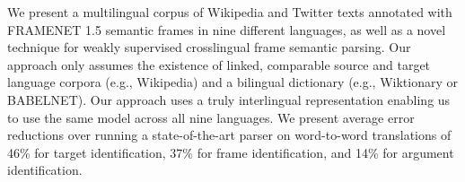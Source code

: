We present a multilingual corpus of Wikipedia and Twitter texts annotated with FRAMENET 1.5 semantic frames in nine different languages, as well as a novel technique for weakly supervised crosslingual frame semantic parsing. Our approach only assumes the existence of linked, comparable source and target language corpora (e.g., Wikipedia) and a bilingual dictionary (e.g., Wiktionary or BABELNET). Our approach uses a truly interlingual representation enabling us to use the same model across all nine languages. We present average error reductions over running a state-of-the-art parser on word-to-word translations of 46\% for target identification, 37\% for frame identification, and 14\% for argument identification.
